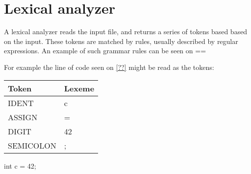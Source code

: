 \section{Lexical analyzer}
A lexical analyzer reads the input file, and returns a series of tokens based based on the input. These tokens are matched by rules, usually described by regular expressions. An example of such grammar rules can be seen on ==

For example the line of code seen on \ref{??} might be read as the tokens:
\begin{tabular}{|l|l|}
	\hline
    Token     & Lexeme \\ \hline
    IDENT     & c      \\ 
    ASSIGN    & =      \\ 
    DIGIT     & 42     \\ 
    SEMICOLON & ;      \\
    \hline
\end{tabular}

\begin{code}
int c = 42;
\end{code}
